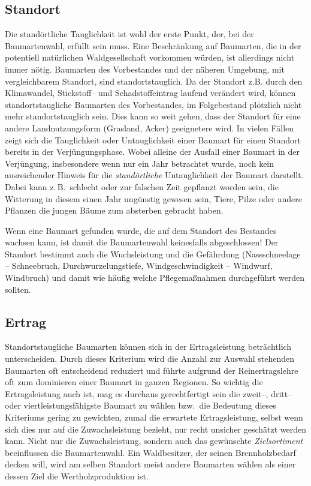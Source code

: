\documentclass[twocolumn]{scrartcl}
\begin{document}
\subsection{Standort}
\label{ssec:standort}

Die standörtliche Tauglichkeit ist wohl der erste Punkt, der, bei der
Baumartenwahl, erfüllt sein muss. Eine Beschränkung auf Baumarten, die
in der potentiell natürlichen Waldgesellschaft vorkommen würden, ist
allerdings nicht immer nötig. Baumarten des Vorbestandes und der
näheren Umgebung, mit vergleichbarem Standort, sind
standortstauglich. Da der Standort z.B. durch den Klimawandel,
Stickstoff-- und Schadstoffeintrag laufend verändert wird, können
standortstaugliche Baumarten des Vorbestandes, im Folgebestand
plötzlich nicht mehr standortstauglich sein. Dies kann so weit gehen,
dass der Standort für eine andere Landnutzungsform (Grasland, Acker)
geeignetere wird. In vielen Fällen zeigt sich die Tauglichkeit oder
Untauglichkeit einer Baumart für einen Standort bereits in der
Verjüngungsphase. Wobei alleine der Ausfall einer Baumart in der
Verjüngung, insbesondere wenn nur ein Jahr betrachtet wurde, noch kein
ausreichender Hinweis für die \emph{standörtliche} Untauglichkeit der
Baumart darstellt. Dabei kann z.\,B.\ schlecht oder zur falschen Zeit
gepflanzt worden sein, die Witterung in diesem einen Jahr ungünstig
gewesen sein, Tiere, Pilze oder andere Pflanzen die jungen Bäume zum
absterben gebracht haben.

Wenn eine Baumart gefunden wurde, die auf dem Standort des Bestandes
wachsen kann, ist damit die Baumartenwahl keinesfalls abgeschlossen!
Der Standort bestimmt auch die Wuchsleistung und die Gefährdung
(Nassschneelage -- Schneebruch, Durchwurzelungstiefe,
Windgeschwindigkeit -- Windwurf, Windbruch) und damit wie häufig
welche Pflegemaßnahmen durchgeführt werden sollten.

\subsection{Ertrag}
\label{ssec:ertrag}

Standortstaugliche Baumarten können sich in der Ertragsleistung
beträchtlich unterscheiden. Durch dieses Kriterium wird die Anzahl zur
Auswahl stehenden Baumarten oft entscheidend reduziert und führte
aufgrund der Reinertragslehre oft zum dominieren einer Baumart in
ganzen Regionen. So wichtig die Ertragsleistung auch ist, mag es
durchaus gerechtfertigt sein die zweit--, dritt-- oder
viertleistungsfähigste Baumart zu wählen bzw.\ die Bedeutung dieses
Kriteriums gering zu gewichten, zumal die erwartete Ertragsleistung,
selbst wenn sich dies nur auf die Zuwachsleistung bezieht, nur recht
unsicher geschätzt werden kann. Nicht nur die Zuwachsleistung, sondern
auch das gewünschte \emph{Zielsortiment} beeinflussen die
Baumartenwahl. Ein Waldbesitzer, der seinen Brennholzbedarf decken
will, wird am selben Standort meist andere Baumarten wählen als einer
dessen Ziel die Wertholzproduktion ist.
\end{document}

